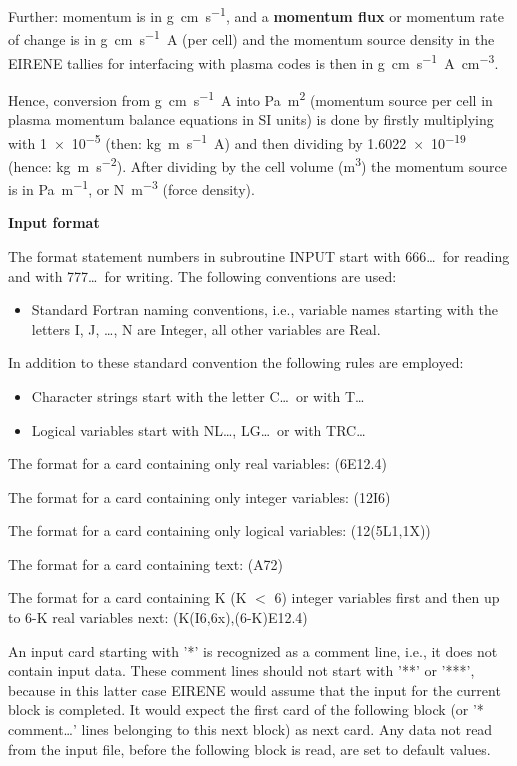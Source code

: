 Further: momentum is in \si{\gram\centi\metre\per\second}, and a
\textbf{momentum flux} or momentum rate of change is in
\si{\gram\centi\metre\per\second\ampere} (per cell) and the momentum source
density in the EIRENE tallies for interfacing with plasma codes is then in
\si{\gram\centi\metre\per\second\ampere\per\cubic\centi\metre}.

Hence, conversion from \si{\gram\centi\metre\per\second\ampere} into
\si{\pascal\square\metre} (momentum source per cell in plasma momentum balance
equations in SI units) is done by firstly multiplying with \num{1e-5} (then:
\si{\kilo\gram\metre\per\second\ampere}) and then dividing by \num{1.6022e-19}
(hence: \si{\kilo\gram\metre\per\square\second}).
After dividing by the cell volume (\si{\cubic\metre}) the momentum source is in
\si{\pascal\per\metre}, or \si{\newton\per\cubic\metre} (force density).

\medskip

\textbf{Input format} 

\medskip 

The format statement numbers in subroutine INPUT start with 666\dots\ for
reading and with 777\dots\ for writing.
The following conventions are used:
\begin{itemize}
  \item Standard Fortran naming conventions, i.e., variable names starting with
        the letters I, J, \dots, N are Integer, all other variables are Real.
\end{itemize}
In addition to these standard convention the following rules are employed:
\begin{itemize}
  \item Character strings start with the letter C\dots\ or with T\dots
  \item
        Logical variables start with NL\dots, LG\dots\ or with TRC\dots
\end{itemize}
The format for a card containing only real variables: (6E12.4)

The format for a card containing only integer variables: (12I6)

The format for a card containing only logical variables: (12(5L1,1X))

The format for a card containing text: (A72) 

The format for a card containing K (K $<$ 6) integer variables first and then
up to 6-K real variables next: (K(I6,6x),(6-K)E12.4) 

An input card starting with '*' is recognized as a comment line, i.e., it does
not contain input data.
These comment lines should not start with  '**' or '***', because in this
latter case EIRENE would assume that the input for the current block is
completed.
It would expect the first card of the following block (or '* comment\dots'
lines belonging to this next block) as next card.
Any data not read from the input file, before the following block is read, are
set to default values.


